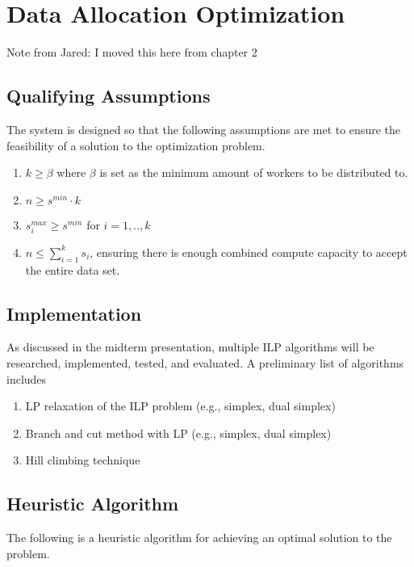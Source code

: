\documentclass[../mthe-493-final-project.tex]{subfiles}
\begin{document}
    \chapter{Data Allocation Optimization}
    \label{ch:data-allocation-optimization}
    
    Note from Jared: I moved this here from chapter 2
    
    \section{Qualifying Assumptions}
    The system is designed so that the following assumptions are met to ensure the feasibility of a solution to the optimization problem.
    
    
    \begin{enumerate}
        \item $k \geq \beta$ where $\beta$ is set as the minimum amount of workers to be distributed to.
        \item $n \geq s^{min} \cdot k$
        \item $s_i^{max} \geq s^{min}$ for $i = 1,..,k$
        \item $n \leq \sum_{i=1}^k s_i$, ensuring there is enough combined compute capacity to accept the entire data set.

    \end{enumerate}
    
    \section{Implementation}
    
    As discussed in the midterm presentation, multiple ILP algorithms will be researched, implemented, tested, and evaluated. A preliminary list of algorithms includes
    
    \begin{enumerate}
        \item LP relaxation of the ILP problem (e.g., simplex, dual simplex)
        \item Branch and cut method with LP (e.g., simplex, dual simplex)
        \item Hill climbing technique
    \end{enumerate}
    
    \section{Heuristic Algorithm}
    The following is a heuristic algorithm for achieving an optimal solution to the problem.
    
\end{document}
